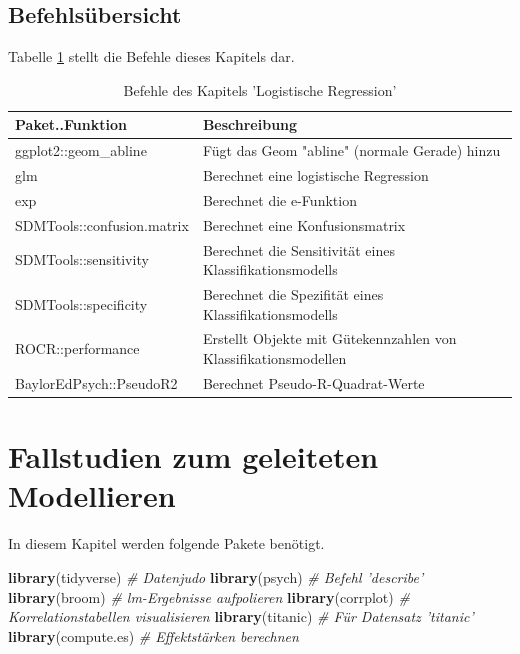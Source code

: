 \documentclass[12pt,ngerman,]{book}
\makeatletter
\newenvironment{Shaded}{\begin{snugshade}}{\end{snugshade}}
\newcommand{\KeywordTok}[1]{\textcolor[rgb]{0.13,0.29,0.53}{\textbf{#1}}}
\newcommand{\CommentTok}[1]{\textcolor[rgb]{0.56,0.35,0.01}{\textit{#1}}}
\newcommand{\NormalTok}[1]{#1}
\newenvironment{kframe}{%
\medskip{}
\setlength{\fboxsep}{.8em}
 \def\at@end@of@kframe{}%
 \ifinner\ifhmode%
  \def\at@end@of@kframe{\end{minipage}}%
  \begin{minipage}{\columnwidth}%
 \fi\fi%
 \def\FrameCommand##1{\hskip\@totalleftmargin \hskip-\fboxsep
 \colorbox{shadecolor}{##1}\hskip-\fboxsep
     \hskip-\linewidth \hskip-\@totalleftmargin \hskip\columnwidth}%
 \MakeFramed {\advance\hsize-\width
   \@totalleftmargin\z@ \linewidth\hsize
   \@setminipage}}%
 {\par\unskip\endMakeFramed%
 \at@end@of@kframe}
\renewenvironment{Shaded}{\begin{kframe}}{\end{kframe}}
\theoremstyle{definition}
\theoremstyle{definition}
\theoremstyle{remark}
\makeatother
\begin{document}
\section{Befehlsübersicht}\label{befehlsubersicht-7}

Tabelle \ref{tab:befehle-logist-regression} stellt die Befehle dieses
Kapitels dar.

\begin{table}

\caption{\label{tab:befehle-logist-regression}Befehle des Kapitels 'Logistische Regression'}
\centering
\begin{tabular}[t]{l|l}
\hline
Paket..Funktion & Beschreibung\\
\hline
ggplot2::geom\_abline & Fügt das Geom "abline" (normale Gerade) hinzu\\
\hline
glm & Berechnet eine logistische Regression\\
\hline
exp & Berechnet die e-Funktion\\
\hline
SDMTools::confusion.matrix & Berechnet eine Konfusionsmatrix\\
\hline
SDMTools::sensitivity & Berechnet die Sensitivität eines Klassifikationsmodells\\
\hline
SDMTools::specificity & Berechnet die Spezifität eines Klassifikationsmodells\\
\hline
ROCR::performance & Erstellt Objekte mit Gütekennzahlen von Klassifikationsmodellen\\
\hline
BaylorEdPsych::PseudoR2 & Berechnet Pseudo-R-Quadrat-Werte\\
\hline
\end{tabular}
\end{table}

\chapter{Fallstudien zum geleiteten
Modellieren}\label{fallstudien-zum-geleiteten-modellieren}

In diesem Kapitel werden folgende Pakete benötigt.

\begin{Shaded}
\begin{Highlighting}[]
\KeywordTok{library}\NormalTok{(tidyverse)  }\CommentTok{# Datenjudo}
\KeywordTok{library}\NormalTok{(psych)  }\CommentTok{# Befehl 'describe'}
\KeywordTok{library}\NormalTok{(broom)  }\CommentTok{# lm-Ergebnisse aufpolieren}
\KeywordTok{library}\NormalTok{(corrplot)  }\CommentTok{# Korrelationstabellen visualisieren}
\KeywordTok{library}\NormalTok{(titanic)  }\CommentTok{# Für Datensatz 'titanic'}
\KeywordTok{library}\NormalTok{(compute.es)  }\CommentTok{# Effektstärken berechnen}
\end{Highlighting}
\end{Shaded}
\end{document}

